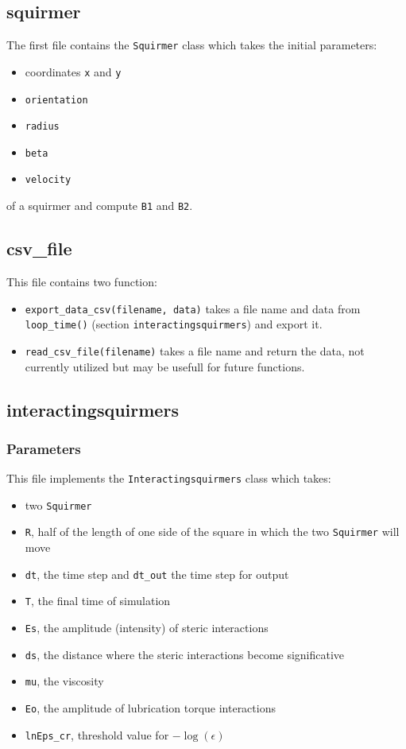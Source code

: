 \documentclass{article}
\begin{document}
\subsection{squirmer}
The first file contains the \texttt{Squirmer} class which takes the initial parameters: 
\begin{itemize}
   \item coordinates \texttt{x} and \texttt{y}
   \item \texttt{orientation}
   \item \texttt{radius}
   \item \texttt{beta}
   \item \texttt{velocity}
\end{itemize}
of a squirmer and compute \texttt{B1} and \texttt{B2}.

\subsection{csv\_file}
This file contains two function:
\begin{itemize}
   \item \texttt{export\_data\_csv(filename, data)} takes a file name and data from \texttt{loop\_time()} (section \texttt{interactingsquirmers}) and export it.
   \item \texttt{read\_csv\_file(filename)} takes a file name and return the data, not currently utilized but may be usefull for future functions.
\end{itemize}

\subsection{interactingsquirmers}
\subsubsection*{Parameters}
This file implements the \texttt{Interactingsquirmers} class which takes:
\begin{itemize}
   \item two \texttt{Squirmer}
   \item \texttt{R}, half of the length of one side of the square in which the two \texttt{Squirmer} will move
   \item \texttt{dt}, the time step and \texttt{dt\_out} the time step for output
   \item \texttt{T}, the final time of simulation
   \item \texttt{Es}, the amplitude (intensity) of steric interactions
   \item \texttt{ds}, the distance where the steric interactions become significative
   \item \texttt{mu}, the viscosity
   \item \texttt{Eo}, the amplitude of lubrication torque interactions
   \item \texttt{lnEps\_cr}, threshold value for \( -\log(\epsilon) \)
\end{itemize}
\end{document}
